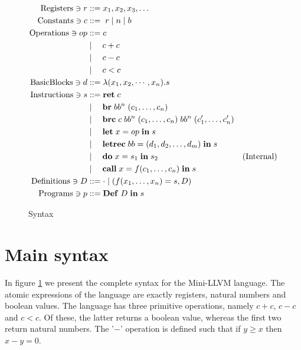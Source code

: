\documentclass[a4paper, oneside, 10pt, draft]{memoir}
\begin{document}
\newcommand{\ibr}[2]{\mathbf{br} \; #1 \; #2}
\newcommand{\ibrc}[5]{\mathbf{brc} \; #1 \; #2 \; #3 \; #4 \; #5}
\newcommand{\ilet}[3]{\mathbf{let} \; #1 = #2 \; \mathbf{in} \; #3}
\newcommand{\iletrec}[3]{\mathbf{letrec} \; #1 = #2 \; \mathbf{in} \; #3}
\newcommand{\ido}[3]{\mathbf{do} \; #1 = #2 \; \mathbf{in} \; #3}
\newcommand{\icall}[4]{\mathbf{call} \; #1 = #2 #3\; \mathbf{in} \;
  #4}
\newcommand{\ipgm}[2]{\mathbf{Def} \; #1 \; \mathbf{in} \; #2}
\begin{figure}
  \begin{align*}
    \registers \ni r & ::= x_1, x_2, x_3, \dotsc\\
    \constants \ni c & ::= \; r \bor \nat \bor \bool \\
    \operations \ni op & ::= c \\
                       & \bor \quad c + c \\
                       & \bor \quad c - c \\
                       & \bor \quad c < c \\
   \basicblocks \ni d  & ::= \lambda (x_1, x_2, \cdots, x_n) . s\\
   \instructions \ni s & ::= \iret{c} \\
                       & \bor \quad \ibr{bb^n}{(c_1, \dotsc, c_n)} \\
                       & \bor \quad \ibrc{c}{bb^n}{(c_1, \dotsc, c_n)}{bb^n}{(c'_1, \dotsc, c'_n)}\\
                       & \bor \quad \ilet{x}{op}{s} \\
                       & \bor \quad \iletrec{bb}{\dbundle}{s} \\
                       & \bor \quad \ido{x}{s_1}{s_2} &
                       (\text{Internal})\\
                       & \bor \quad \icall{x}{f}{(c_1, \dotsc,
                         c_n)}{s}\\
    \definitions \ni D & ::= \cdot \bor (f(x_1, \dotsc, x_n) = s, D)\\
    \programs \ni p & ::= \ipgm{D}{s}
  \end{align*}
  \caption{Syntax}
  \label{fig:syntax}
\end{figure}

\section{Main syntax}

In figure \ref{fig:syntax} we present the complete syntax for the
Mini-LLVM language. The atomic expressions of the language are exactly
registers, natural numbers and boolean values. The language has three
primitive operations, namely $c + c$, $c - c$ and $c < c$. Of these,
the latter returns a boolean value, whereas the first two return
natural numbers. The '$-$' operation is defined such that if $y \geq
x$ then $x - y = 0$.
\end{document}
